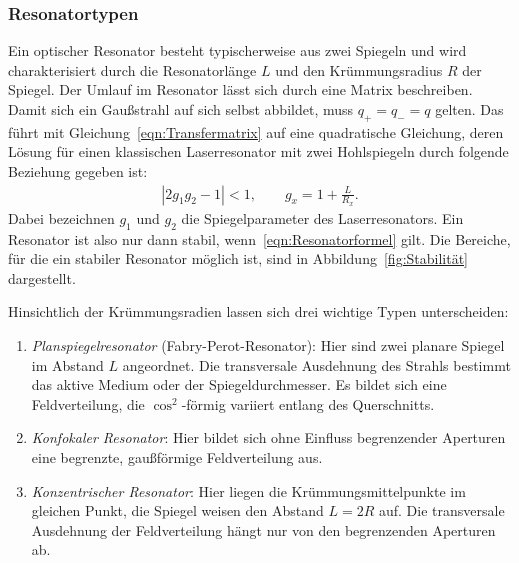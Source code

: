 \documentclass[a4paper,twoside,final]{article}
\begin{document}
\subsubsection{Resonatortypen}
Ein optischer Resonator besteht typischerweise aus zwei Spiegeln und wird charakterisiert durch die Resonatorlänge $L$ und den Krümmungsradius $R$ der Spiegel. Der Umlauf im Resonator lässt sich durch eine Matrix beschreiben. Damit sich ein Gaußstrahl auf sich selbst abbildet, muss $q_+ = q_- = q$ gelten. Das führt mit Gleichung~\eqref{eqn:Transfermatrix} auf eine quadratische Gleichung, deren Lösung für einen klassischen Laserresonator mit zwei Hohlspiegeln durch folgende Beziehung gegeben ist:
\begin{align}\label{eqn:Resonatorformel}
  |2g_1 g_2 -1 | < 1, \qquad g_x = 1 + \frac{L}{R_x}.
\end{align}
Dabei bezeichnen $g_1$ und $g_2$ die Spiegelparameter des Laserresonators. Ein Resonator ist also nur dann stabil, wenn~\eqref{eqn:Resonatorformel} gilt. Die Bereiche, für die ein stabiler Resonator möglich ist, sind in Abbildung~\ref{fig:Stabilität} dargestellt.



Hinsichtlich der Krümmungsradien lassen sich drei wichtige Typen unterscheiden:

\begin{enumerate}[label=\Alph*)]
  \item \emph{Planspiegelresonator} (Fabry-Perot-Resonator): Hier sind zwei planare Spiegel im Abstand $L$ angeordnet. Die transversale Ausdehnung des Strahls bestimmt das aktive Medium oder der Spiegeldurchmesser. Es bildet sich eine Feldverteilung, die $\cos^2$-förmig variiert entlang des Querschnitts.
  \item \emph{Konfokaler Resonator}: Hier bildet sich ohne Einfluss begrenzender Aperturen eine begrenzte, gaußförmige Feldverteilung aus.
  \item \emph{Konzentrischer Resonator}: Hier liegen die Krümmungsmittelpunkte im gleichen Punkt, die Spiegel weisen den Abstand $L=2R$ auf. Die transversale Ausdehnung der Feldverteilung hängt nur von den begrenzenden Aperturen ab.
\end{enumerate}
\FloatBarrier
\end{document}
